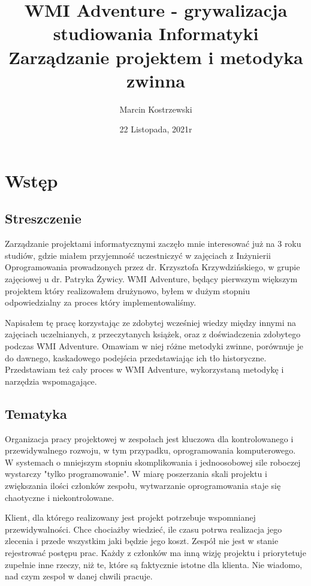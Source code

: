 \documentclass{article}
\title{
    WMI Adventure - grywalizacja studiowania Informatyki \\
    \large Zarządzanie projektem i metodyka zwinna
    }
\author{Marcin Kostrzewski}
\date{22 Listopada, 2021r}
\begin{document}
\maketitle
\newpage
\tableofcontents
\newpage


\section{Wstęp}

\subsection{Streszczenie}
Zarządzanie projektami informatycznymi zaczęło mnie interesować już na 3 roku studiów, gdzie miałem przyjemność uczestniczyć w zajęciach z Inżynierii Oprogramowania prowadzonych przez
dr. Krzysztofa Krzywdzińskiego, w grupie zajęciowej u dr. Patryka Żywicy. WMI Adventure, będący pierwszym większym projektem który realizowałem drużynowo, byłem w dużym stopniu odpowiedzialny za
proces który implementowaliśmy.

Napisałem tę pracę korzystając ze zdobytej wcześniej wiedzy między innymi na zajęciach uczelnianych, z przeczytanych książek,
oraz z doświadczenia zdobytego podczas WMI Adventure. Omawiam w niej różne metodyki zwinne, porównuje je do dawnego, kaskadowego podejścia przedstawiając ich tło historyczne. Przedstawiam też cały proces w WMI Adventure, wykorzystaną metodykę i narzędzia wspomagające.

\subsection{Tematyka}
Organizacja pracy projektowej w zespołach jest kluczowa dla kontrolowanego i przewidywalnego rozwoju, w tym przypadku, oprogramowania komputerowego. W systemach o mniejszym stopniu skomplikowania
i jednoosobowej sile roboczej wystarczy "tylko programowanie". W miarę poszerzania skali projektu i zwiększania ilości członków zespołu, wytwarzanie oprogramowania staje się chaotyczne i niekontrolowane.

Klient, dla którego realizowany jest projekt potrzebuje wspomnianej przewidywalności. Chce chociażby wiedzieć, ile czasu potrwa realizacja jego zlecenia i przede wszystkim jaki będzie jego koszt. Zespół nie jest w stanie
rejestrować postępu prac. Każdy z członków ma inną wizję projektu i priorytetuje zupełnie inne rzeczy, niż te, które są faktycznie istotne dla klienta. Nie wiadomo, nad czym zespoł w danej chwili pracuje.
\end{document}
